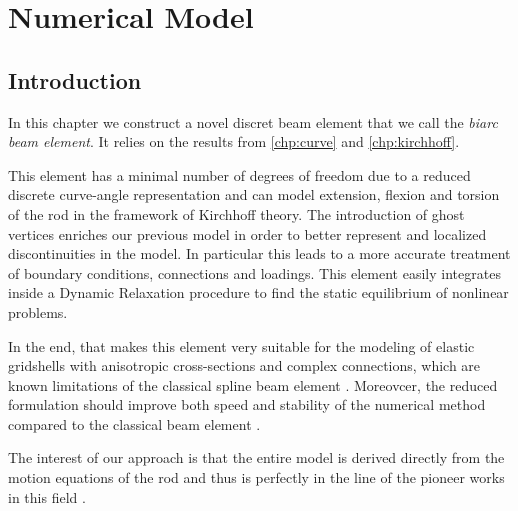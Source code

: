 
\chapter{Numerical Model} \label{chp:numerical_model}

\section{Introduction}
In this chapter we construct a novel discret beam element that we call the \emph{biarc beam element}. It relies on the results from \cref{chp:curve} and \cref{chp:kirchhoff}.

This element has a minimal number of degrees of freedom due to a reduced discrete curve-angle representation and can model extension, flexion and torsion of the rod in the framework of Kirchhoff theory. The introduction of ghost vertices enriches our previous model \cite{DuPeloux2015,Lefevre2017} in order to better represent and localized discontinuities in the model. In particular this leads to a more accurate treatment of boundary conditions, connections and loadings. This element easily integrates inside a Dynamic Relaxation procedure to find the static equilibrium of nonlinear problems.

In the end, that makes this element very suitable for the modeling of elastic gridshells with anisotropic cross-sections and complex connections, which are known limitations of the classical  spline beam element \cite{Adriaenssens2001,Douthe2006}. Moreovcer, the reduced formulation should improve both speed and stability of the numerical method compared to the classical  beam element \cite{Adriaenssens2000,DAmico2014}.

The interest of our approach is that the entire model is derived directly from the motion equations of the rod and thus is perfectly in the line of the pioneer works in this field \cite{Day1965}.

